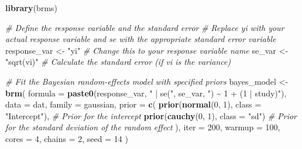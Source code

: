 \documentclass[
]{book}
\newenvironment{Shaded}{\begin{snugshade}}{\end{snugshade}}
\newcommand{\AttributeTok}[1]{\textcolor[rgb]{0.13,0.29,0.53}{#1}}
\newcommand{\CommentTok}[1]{\textcolor[rgb]{0.56,0.35,0.01}{\textit{#1}}}
\newcommand{\DecValTok}[1]{\textcolor[rgb]{0.00,0.00,0.81}{#1}}
\newcommand{\FunctionTok}[1]{\textcolor[rgb]{0.13,0.29,0.53}{\textbf{#1}}}
\newcommand{\NormalTok}[1]{#1}
\newcommand{\OtherTok}[1]{\textcolor[rgb]{0.56,0.35,0.01}{#1}}
\newcommand{\StringTok}[1]{\textcolor[rgb]{0.31,0.60,0.02}{#1}}
\begin{document}
\begin{Shaded}
\begin{Highlighting}[]
\FunctionTok{library}\NormalTok{(brms)}

\CommentTok{\# Define the response variable and the standard error}
\CommentTok{\# Replace \textquotesingle{}yi\textquotesingle{} with your actual response variable and \textquotesingle{}se\textquotesingle{} with the appropriate standard error variable}
\NormalTok{response\_var }\OtherTok{\textless{}{-}} \StringTok{"yi"}  \CommentTok{\# Change this to your response variable name}
\NormalTok{se\_var }\OtherTok{\textless{}{-}} \StringTok{"sqrt(vi)"}  \CommentTok{\# Calculate the standard error (if vi is the variance)}

\CommentTok{\# Fit the Bayesian random{-}effects model with specified priors}
\NormalTok{bayes\_model }\OtherTok{\textless{}{-}} \FunctionTok{brm}\NormalTok{(}
  \AttributeTok{formula =} \FunctionTok{paste0}\NormalTok{(response\_var, }\StringTok{" | se("}\NormalTok{, se\_var, }\StringTok{") \textasciitilde{} 1 + (1 | study)"}\NormalTok{),}
  \AttributeTok{data =}\NormalTok{ dat,}
  \AttributeTok{family =}\NormalTok{ gaussian,}
  \AttributeTok{prior =} \FunctionTok{c}\NormalTok{(}
    \FunctionTok{prior}\NormalTok{(}\FunctionTok{normal}\NormalTok{(}\DecValTok{0}\NormalTok{, }\DecValTok{1}\NormalTok{), }\AttributeTok{class =} \StringTok{"Intercept"}\NormalTok{),   }\CommentTok{\# Prior for the intercept}
    \FunctionTok{prior}\NormalTok{(}\FunctionTok{cauchy}\NormalTok{(}\DecValTok{0}\NormalTok{, }\DecValTok{1}\NormalTok{), }\AttributeTok{class =} \StringTok{"sd"}\NormalTok{)            }\CommentTok{\# Prior for the standard deviation of the random effect}
\NormalTok{  ),}
  \AttributeTok{iter =} \DecValTok{200}\NormalTok{,}
  \AttributeTok{warmup =} \DecValTok{100}\NormalTok{,}
  \AttributeTok{cores =} \DecValTok{4}\NormalTok{,}
  \AttributeTok{chains =} \DecValTok{2}\NormalTok{,}
  \AttributeTok{seed =} \DecValTok{14}
\NormalTok{)}
\end{Highlighting}
\end{Shaded}
\end{document}
